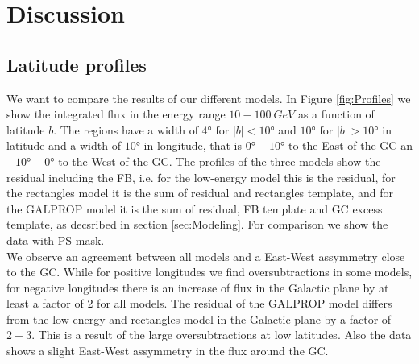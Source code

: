 \section{Discussion}


\subsection{Latitude profiles}
\label{sec:Latitude_profiles}

We want to compare the results of our different models. In Figure \ref{fig:Profiles} we show the integrated flux in the energy range $10 - \SI{100}{GeV}$ as a function of latitude $b$. The regions have a width of $\ang{4}$ for $|b|<\ang{10}$ and $\ang{10}$ for $|b|>\ang{10}$ in latitude and a width of $\ang{10}$ in longitude, that is $\ang{0} - \ang{10}$ to the East of the GC an $\ang{-10} - \ang{0}$ to the West of the GC. The profiles of the three models show the residual including the FB, i.e. for the low-energy model this is the residual, for the rectangles model it is the sum of residual and rectangles template, and for the GALPROP model it is the sum of residual, FB template and GC excess template, as decsribed in section \ref{sec:Modeling}. For comparison we show the data with PS mask.\\
We observe an agreement between all models and a East-West assymmetry close to the GC. While for positive longitudes we find oversubtractions in some models, for negative longitudes there is an increase of flux in the Galactic plane by at least a factor of 2 for all models. The residual of the GALPROP model differs from the low-energy and rectangles model in the Galactic plane by a factor of $2-3$. This is a result of the large oversubtractions at low latitudes.
Also the data shows a slight East-West assymmetry in the flux around the GC.


